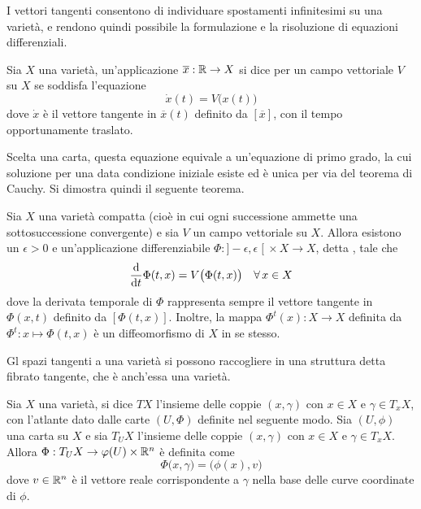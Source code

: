 I vettori tangenti consentono di individuare spostamenti infinitesimi su una varietà, e rendono quindi possibile la formulazione e la risoluzione di equazioni differenziali.

\begin{definition}
  Sia $X$ una varietà, un'applicazione $\overline{x}:\mathbb{R} \to X$ si dice  per un campo vettoriale $V$ su $X$ se soddisfa l'equazione \begin{equation*}
  \dot{x}(t) = V\big(x(t)\big)
  \end{equation*} 
  dove $\dot{x}$ è il vettore tangente in $\overline{x}(t)$ definito da $[\overline{x}]$, con il tempo opportunamente traslato.
\end{definition}
\begin{remark}
  Scelta una carta, questa equazione equivale a un'equazione di primo grado, la cui soluzione per una data condizione iniziale esiste ed è unica per via del teorema di Cauchy. Si dimostra quindi il seguente teorema.
\end{remark}
\begin{theorem}
  Sia $X$ una varietà compatta (cioè in cui ogni successione ammette una sottosuccessione convergente) e sia $V$ un campo vettoriale su $X$. Allora esistono un $\epsilon > 0$ e un'applicazione differenziabile $\Phi:]-\epsilon, \epsilon\;[\ \times X \to X$, detta , tale che \begin{equation*}
  \dv{t} \Phi(t,x) = V\big( \Phi(t,x)\big) \quad \forall\, x \in  X
  \end{equation*} 
  dove la derivata temporale di $\Phi$ rappresenta sempre il vettore tangente in $\Phi(x,t)$ definito da $[\Phi(t,x)]$. Inoltre, la mappa $\Phi^t(x):X \to X$ definita da $\Phi^t:x \mapsto \Phi(t,x)$ è un diffeomorfismo di $X$ in se stesso.
\end{theorem}

Gl spazi tangenti a una varietà si possono raccogliere in una struttura detta fibrato tangente, che è anch'essa una varietà.

\begin{definition} \label{def:tanBundle}
  Sia $X$ una varietà, si dice  $TX$ l'insieme delle coppie $(x,\gamma)$ con $x \in X$ e $\gamma \in T_x X$, con l'atlante dato dalle carte $(U, \Phi)$ definite nel seguente modo. Sia $(U, \phi)$ una carta su $X$ e sia $T_U X$ l'insieme delle coppie $(x,\gamma)$ con $x \in X$ e $\gamma \in T_x X$. Allora $\Phi:T_U X \to \varphi(U) \times \mathbb{R}^{n}$ è definita come \begin{equation}
  \Phi \big(x,\gamma\big) = \big(\phi(x), v\big)
  \end{equation} 
  dove $v \in \mathbb{R}^{n}$ è il vettore reale corrispondente a $\gamma$ nella base delle curve coordinate di $\phi$.
\end{definition}

